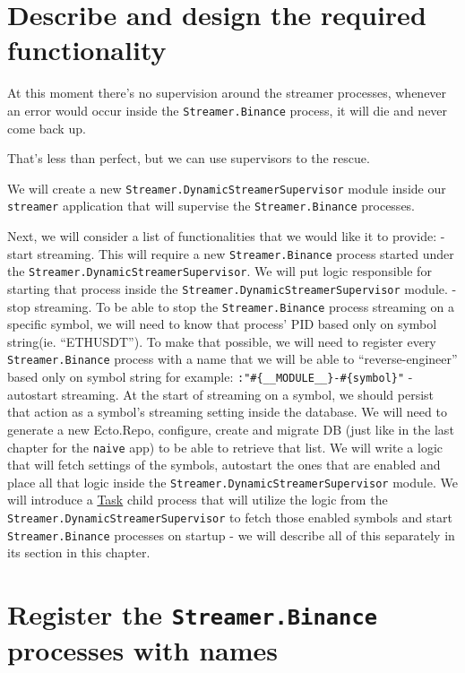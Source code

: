\documentclass[
  oneside]{book}
\begin{document}
\hypertarget{describe-and-design-the-required-functionality-2}{%
\section{Describe and design the required functionality}\label{describe-and-design-the-required-functionality-2}}

At this moment there's no supervision around the streamer processes, whenever an error would occur inside the \texttt{Streamer.Binance} process, it will die and never come back up.

That's less than perfect, but we can use supervisors to the rescue.

We will create a new \texttt{Streamer.DynamicStreamerSupervisor} module inside our \texttt{streamer} application that will supervise the \texttt{Streamer.Binance} processes.

Next, we will consider a list of functionalities that we would like it to provide:
- start streaming. This will require a new \texttt{Streamer.Binance} process started under the
\texttt{Streamer.DynamicStreamerSupervisor}. We will put logic responsible for starting that process inside the \texttt{Streamer.DynamicStreamerSupervisor} module.
- stop streaming. To be able to stop the \texttt{Streamer.Binance} process streaming on a specific symbol, we will need to know that process' PID based only on symbol string(ie. ``ETHUSDT''). To make that possible, we will need to register every \texttt{Streamer.Binance} process with a name that we will be able to ``reverse-engineer'' based only on symbol string for example: \texttt{:"\#\{\_\_MODULE\_\_\}-\#\{symbol\}"}
- autostart streaming. At the start of streaming on a symbol, we should persist that action as a symbol's streaming setting inside the database. We will need to generate a new Ecto.Repo, configure, create and migrate DB (just like in the last chapter for the \texttt{naive} app) to be able to retrieve that list. We will write a logic that will fetch settings of the symbols, autostart the ones that are enabled and place all that logic inside the \texttt{Streamer.DynamicStreamerSupervisor} module. We will introduce a \href{https://hexdocs.pm/elixir/master/Task.html}{Task} child process that will utilize the logic from the \texttt{Streamer.DynamicStreamerSupervisor} to fetch those enabled symbols and start \texttt{Streamer.Binance} processes on startup - we will describe all of this separately in its section in this chapter.

\hypertarget{register-the-streamer.binance-processes-with-names}{%
\section{\texorpdfstring{Register the \texttt{Streamer.Binance} processes with names}{Register the Streamer.Binance processes with names}}\label{register-the-streamer.binance-processes-with-names}}
\end{document}
